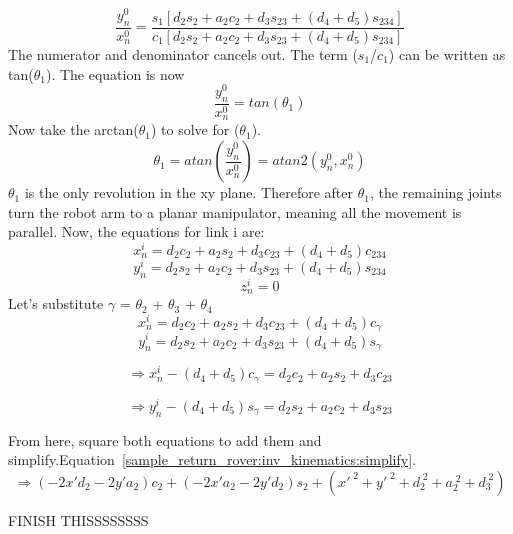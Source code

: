 \begin{equation}
	\frac{y^{0}_{n}}{x^{0}_{n}} = 
		\frac{s_{1}[d_{2}s_{2}+a_{2}c_{2}+d_{3}s_{23}+(d_{4}+d_{5})s_{234}]}
	{c_{1}[d_{2}s_{2}+a_{2}c_{2}+d_{3}s_{23}+(d_{4}+d_{5})s_{234}]}
	\label{sample_return_rover:inv_kinematics:th1}
\end{equation}
The numerator and denominator cancels out. The term ($s_{1}$/$c_{1}$) can be written as tan($\theta_{1}$). The equation is now 
\begin{equation}
	\frac{y^{0}_{n}}{x^{0}_{n}} = tan(\theta_{1})
\end{equation}
Now take the arctan($\theta_{1}$) to solve for ($\theta_{1}$).
\begin{equation}
	\theta_{1} = atan(\frac{y^{0}_{n}}{x^{0}_{n}}) =  atan2(y^{0}_{n}, x^{0}_{n})
\end{equation}
 $\theta_{1}$ is the only revolution in the xy plane. Therefore after $\theta_{1}$, the remaining joints turn the robot arm to a planar manipulator, meaning all the movement is parallel. Now, the equations for link i are:
 \begin{equation} \nonumber
 	x^{i}_{n} = d_{2}c_{2}+a_{2}s_{2}+d_{3}c_{23}+(d_{4}+d_{5})c_{234}
 \end{equation}
\begin{equation}
		y^{i}_{n}= d_{2}s_{2}+a_{2}c_{2}+d_{3}s_{23}+(d_{4}+d_{5})s_{234}
\end{equation}
\begin{equation} \nonumber
	z^{i}_{n} = 0
\end{equation}
Let's substitute $\gamma$ = $\theta_{2}$ + $\theta_{3}$ + $\theta_{4}$
 \begin{equation} \nonumber
	x^{i}_{n} = d_{2}c_{2}+a_{2}s_{2}+d_{3}c_{23}+(d_{4}+d_{5})c_{\gamma}
\end{equation}
\begin{equation}\nonumber
	y^{i}_{n} = d_{2}s_{2}+a_{2}c_{2}+d_{3}s_{23}+(d_{4}+d_{5})s_{\gamma}
\end{equation}

\begin{equation}\nonumber
	\Rightarrow x^{i}_{n} -(d_{4}+d_{5})c_{\gamma} = d_{2}c_{2}+a_{2}s_{2}+d_{3}c_{23}
\end{equation}

\begin{equation}\nonumber
	\Rightarrow y^{i}_{n} -(d_{4}+d_{5})s_{\gamma} = d_{2}s_{2}+a_{2}c_{2}+d_{3}s_{23}
\end{equation}

From here, square both equations to add them and simplify.Equation~\ref{sample_return_rover:inv_kinematics:simplify}.
\begin{equation}
	\Rightarrow (-2x'd_{2}-2y'a_{2})c_{2}+(-2x'a_{2}-2y'd_{2})s_{2}+(x'^{\;2}+y'^{\;2}+d_{2}^{\;2}+a_{2}^{\;2}+d_{3}^{\; 2})
\label{sample_return_rover:inv_kinematics:simplify}
\end{equation}

FINISH THISSSSSSSS
